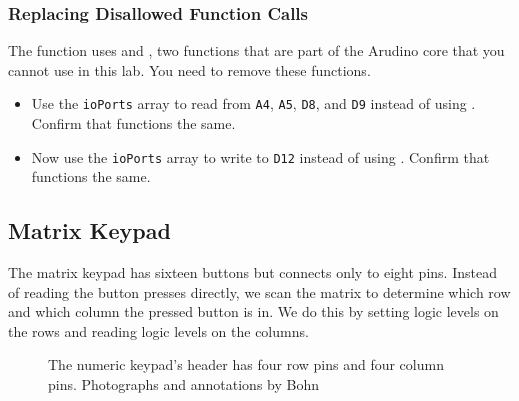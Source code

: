 \subsubsection{Replacing Disallowed Function Calls}

The  function uses  and
, two functions that are part of the Arudino core that
you cannot use in this lab. You need to remove these functions.

    \begin{itemize}
    \item Use the \lstinline{ioPorts} array to read from \texttt{A4},
        \texttt{A5}, \texttt{D8}, and \texttt{D9} instead of using
        . Confirm that 
        functions the same.
    \item Now use the \lstinline{ioPorts} array to write to \texttt{D12}
        instead of using . Confirm that
         functions the same.
    \end{itemize}

\subsection{Matrix Keypad}

The matrix keypad has sixteen buttons but connects only to eight pins. Instead
of reading the button presses directly, we scan the matrix to determine
which row and which column the pressed button is in. We do this by setting
logic levels on the rows and reading logic levels on the columns.

\begin{figure}
    \centering
    \hfil
    \caption{The numeric keypad's header has four row pins and four column pins. \tiny Photographs and annotations by Bohn \label{fig:keypad-annotated}}
\end{figure}

